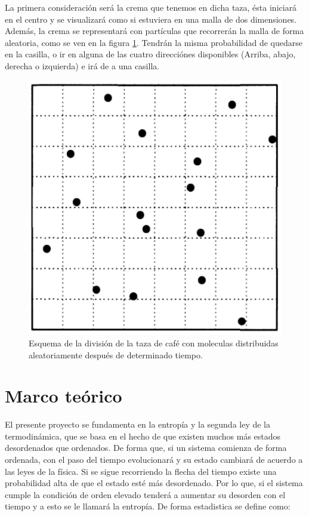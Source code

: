\documentclass{article}
\begin{document}
\begin{multicols}{2}
La primera consideración será la crema que tenemos en dicha taza, ésta iniciará en el centro y se visualizará como si estuviera en una malla de dos dimensiones. Además, la crema se representará con partículas que recorrerán la malla de forma aleatoria, como se ven en la figura \ref{Esquema}. Tendrán la misma probabilidad de quedarse en la casilla, o ir en alguna de las cuatro direcciónes disponibles (Arriba, abajo, derecha o izquierda) e irá de a una casilla.
\begin{figure}[H]
    \centering
    \includegraphics[scale=0.4]{Malla.png}
    \caption{Esquema de la división de la taza de café con moleculas distribuidas aleatoriamente después de determinado tiempo.}
    \label{Esquema}
\end{figure}

\section*{Marco teórico}

El presente proyecto se fundamenta en la entropía y la segunda ley de la termodinámica, que se basa en el hecho de que existen muchos más estados desordenados que ordenados. De forma que, si un sistema comienza de forma ordenada, con el paso del tiempo evolucionará y su estado cambiará de acuerdo a las leyes de la física. Si se sigue recorriendo la flecha del tiempo existe una probabilidad alta de que el estado esté más desordenado. Por lo que, si el sistema cumple la condición de orden elevado tenderá a aumentar su desorden con el tiempo y a esto se le llamará la entropía. De forma estadistica se define como:


\end{multicols}
\end{document}
